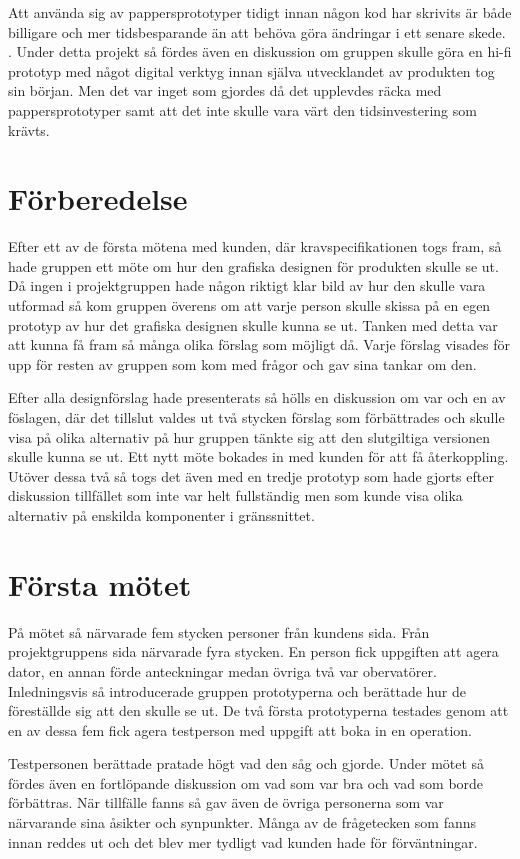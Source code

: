 Att använda sig av pappersprototyper tidigt innan någon kod har skrivits är både billigare och mer tidsbesparande än att behöva göra ändringar i ett senare skede. \cite{paper}. Under detta projekt så fördes även en diskussion om gruppen skulle göra en hi-fi prototyp med något digital verktyg innan själva utvecklandet av produkten tog sin början. Men det var inget som gjordes då det upplevdes räcka med pappersprototyper samt att det inte skulle vara värt den tidsinvestering som krävts.      

\section{Förberedelse}
Efter ett av de första mötena med kunden, där kravspecifikationen togs fram, så hade gruppen ett möte om hur den grafiska designen för produkten  skulle se ut. Då ingen i projektgruppen hade någon riktigt klar bild av hur den skulle vara utformad så kom gruppen överens om att varje person skulle skissa på en egen prototyp av hur det grafiska designen skulle kunna se ut. Tanken med detta var att kunna få fram så många olika förslag som möjligt då. Varje förslag visades för upp för resten av gruppen som kom med frågor och gav sina tankar om den.

Efter alla designförslag hade presenterats så hölls en diskussion om var och en av föslagen, där det tillslut valdes ut två stycken förslag som förbättrades och skulle visa på olika alternativ på hur gruppen tänkte sig att den slutgiltiga versionen skulle kunna se ut. Ett nytt möte bokades in med kunden för att få återkoppling. Utöver dessa två så togs det även med en tredje prototyp som hade gjorts efter diskussion tillfället som inte var helt fullständig men som kunde visa olika alternativ på enskilda komponenter i gränssnittet.

\section{Första mötet}
På mötet så närvarade fem stycken personer från kundens sida. Från projektgruppens sida närvarade fyra stycken. En person fick uppgiften att agera dator, en annan förde anteckningar medan övriga två var obervatörer. Inledningsvis så introducerade gruppen prototyperna och berättade hur de föreställde sig att den skulle se ut. De två första prototyperna testades genom att en av dessa fem fick agera testperson med uppgift att boka in en operation.

Testpersonen berättade pratade högt vad den såg och gjorde. Under mötet så fördes även en fortlöpande diskussion om vad som var bra och vad som borde förbättras. När tillfälle fanns så gav även de övriga personerna som var närvarande sina åsikter och synpunkter. Många av de frågetecken som fanns innan reddes ut och det blev mer tydligt vad kunden hade för förväntningar. 

